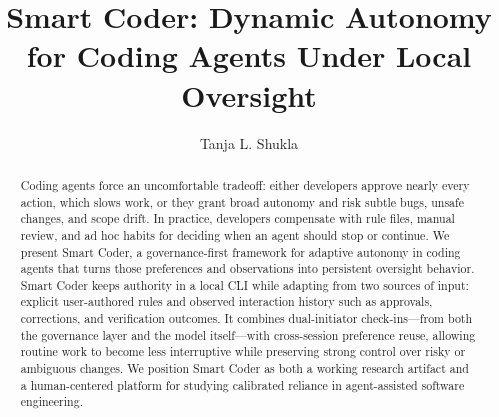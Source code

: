 \documentclass[sigconf,review]{acmart}
\title{Smart Coder: Dynamic Autonomy for Coding Agents Under Local Oversight}
\author{Tanja L. Shukla}
\affiliation{%
  \institution{TODO}
  \city{TODO}
  \state{TODO}
  \country{USA}
}
\begin{document}
\begin{abstract}
Coding agents force an uncomfortable tradeoff: either developers approve nearly every action, which slows work, or they grant broad autonomy and risk subtle bugs, unsafe changes, and scope drift. In practice, developers compensate with rule files, manual review, and ad hoc habits for deciding when an agent should stop or continue. We present Smart Coder, a governance-first framework for adaptive autonomy in coding agents that turns those preferences and observations into persistent oversight behavior. Smart Coder keeps authority in a local CLI while adapting from two sources of input: explicit user-authored rules and observed interaction history such as approvals, corrections, and verification outcomes. It combines dual-initiator check-ins---from both the governance layer and the model itself---with cross-session preference reuse, allowing routine work to become less interruptive while preserving strong control over risky or ambiguous changes. We position Smart Coder as both a working research artifact and a human-centered platform for studying calibrated reliance in agent-assisted software engineering.
\end{abstract}


\maketitle








\end{document}
